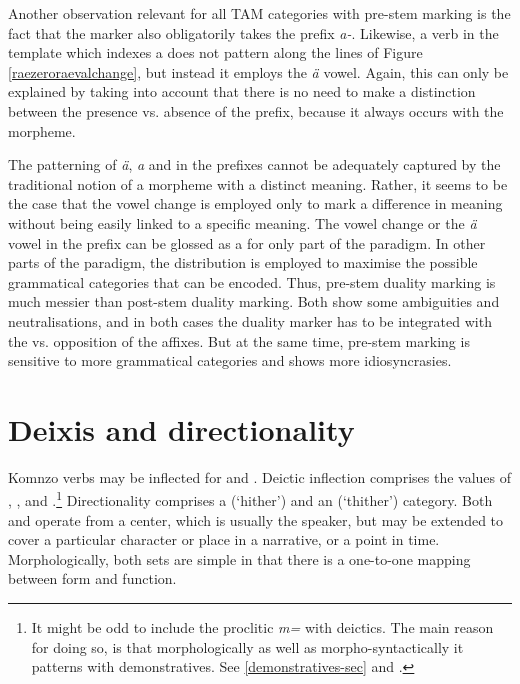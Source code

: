 Another observation relevant for all TAM categories with pre-stem  marking is the fact that the  marker also obligatorily takes the  prefix \emph{a-}. Likewise, a verb in the  template which indexes a   does not pattern along the lines of Figure \ref{raezeroraevalchange}, but instead it employs the \emph{ä} vowel. Again, this can only be explained by taking into account that there is no need to make a distinction between the presence vs. absence of the  prefix, because it always occurs with the  morpheme.

The patterning of \emph{ä}, \emph{a} and \emph{\Zero} in the prefixes cannot be adequately captured by the traditional notion of a morpheme with a distinct meaning. Rather, it seems to be the case that the vowel change is employed only to mark a difference in meaning without being easily linked to a specific meaning. The vowel change or the \emph{ä} vowel in the prefix can be glossed as a  for only part of the paradigm. In other parts of the paradigm, the distribution is employed to maximise the possible grammatical categories that can be encoded. Thus, pre-stem duality marking is much messier than post-stem duality marking. Both show some ambiguities and neutralisations, and in both cases the duality marker has to be integrated with the  vs.  opposition of the  affixes. But at the same time, pre-stem  marking is sensitive to more grammatical categories and shows more idiosyncrasies.

\section{Deixis and directionality} \label{deixisanddirectionality}

Komnzo verbs may be inflected for  and . Deictic inflection comprises the values of , ,  and .\footnote{It might be odd to include the proclitic \emph{m=} with deictics. The main reason for doing so, is that morphologically as well as morpho-syntactically it patterns with demonstratives. See \ref{demonstratives-sec} and .} Directionality comprises a  (`hither') and an  (`thither') category. Both  and  operate from a  center, which is usually the speaker, but may be extended to cover a particular character or place in a narrative, or a point in time. Morphologically, both sets are simple in that there is a one-to-one mapping between form and function.

